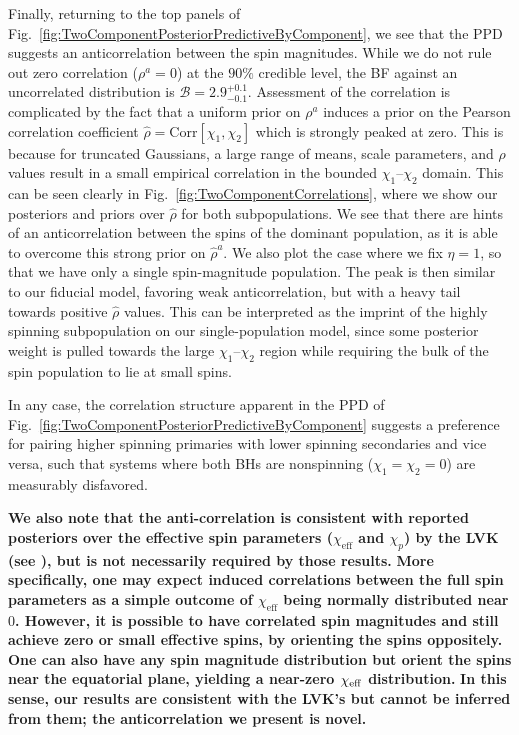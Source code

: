 \documentclass[twocolumn,usenames,dvipsnames,linenumbers]{aastex631}
\newcommand{\dominantcorrelatedBF}{\ensuremath{2.9^{+0.1}_{-0.1}}\xspace}
\begin{document}
	
Finally, returning to the top panels of Fig.~\ref{fig:TwoComponentPosteriorPredictiveByComponent}, we see that 
the \ac{PPD} suggests an anticorrelation between the spin magnitudes.
While we do not rule out zero correlation ($\rho^a = 0$) at the $90\%$ credible level, the \ac{BF} against an uncorrelated distribution is $\mathcal{B} = \dominantcorrelatedBF$. 
Assessment of the correlation is complicated by the fact that a uniform prior on $\rho^a$ induces a prior on the Pearson correlation coefficient $\hat{\rho} = \text{Corr}[\chi_1, \chi_2]$ which is strongly peaked at zero.
This is because for truncated Gaussians, a large range of means, scale parameters, and $\rho$ values result in a small empirical correlation in the bounded $\chi_1$--$\chi_2$ domain.
This can be seen clearly in Fig.~\ref{fig:TwoComponentCorrelations}, where we show our posteriors and priors over  $\hat \rho$ for both subpopulations.
We see that there are hints of an anticorrelation between the spins of the dominant population, as it is able to overcome this strong prior on $\hat \rho^a$.
We also plot the case where we fix $\eta = 1$, so that we have only a single spin-magnitude population.
The peak is then similar to our fiducial model, favoring weak anticorrelation, but with a heavy tail towards positive $\hat \rho$ values.
This can be interpreted as the imprint of the highly spinning subpopulation on our single-population model, since some posterior weight is pulled towards the large $\chi_1$--$\chi_2$ region while requiring the bulk of the spin population to lie at small spins.

In any case, the correlation structure apparent in the \ac{PPD} of Fig.~\ref{fig:TwoComponentPosteriorPredictiveByComponent} suggests a preference for pairing higher spinning primaries with lower spinning secondaries and vice versa, such that systems where both \acp{BH} are nonspinning ($\chi_1= \chi_2=0$) are measurably disfavored.

\textbf{We also note that the anti-correlation is consistent with reported posteriors over the effective spin parameters ($\chi_{\textrm{eff}}$ and $\chi_p$) by the \ac{LVK} (see \cite{KAGRA:2021duu}), but is not necessarily required by those results.}
\textbf{More specifically, one may expect induced correlations between the full spin parameters as a simple outcome of $\chi_{\textrm{eff}}$ being normally distributed near $0$. However, it is possible to have correlated spin magnitudes and still achieve zero or small effective spins, by orienting the spins oppositely. }
\textbf{One can also have any spin magnitude distribution but orient the spins near the equatorial plane, yielding a near-zero  $\chi_{\rm eff}$ distribution.} 
\textbf{In this sense, our results are consistent with the LVK’s but cannot be inferred from them; the anticorrelation we present is novel.}
\end{document}
